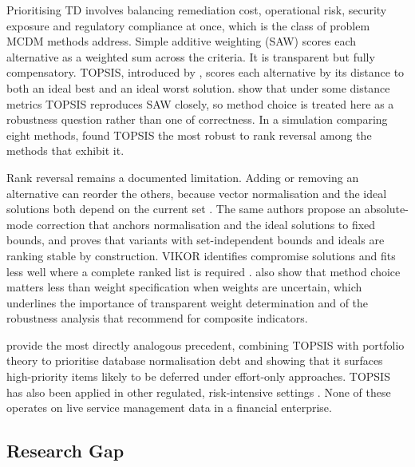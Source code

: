 \documentclass[
  authoryear,
  preprint]{elsarticle}
\begin{document}
Prioritising TD involves balancing remediation cost, operational risk,
security exposure and regulatory compliance at once, which is the class
of problem MCDM methods address. Simple additive weighting (SAW) scores
each alternative as a weighted sum across the criteria. It is
transparent but fully compensatory. TOPSIS, introduced by
\citet{hwangMultipleAttributeDecision1981}, scores each alternative by
its distance to both an ideal best and an ideal worst solution.
\citet{ciardielloComparisonTOPSISSAW2023} show that under some distance
metrics TOPSIS reproduces SAW closely, so method choice is treated here
as a robustness question rather than one of correctness. In a simulation
comparing eight methods, \citet{zanakisMultiattributeDecisionMaking1998}
found TOPSIS the most robust to rank reversal among the methods that
exhibit it.

Rank reversal remains a documented limitation. Adding or removing an
alternative can reorder the others, because vector normalisation and the
ideal solutions both depend on the current set
\citep{garcia-cascalesRankReversalTOPSIS2012}. The same authors propose
an absolute-mode correction that anchors normalisation and the ideal
solutions to fixed bounds, and \citet{yangIngeniousSolutionRank2020}
proves that variants with set-independent bounds and ideals are ranking
stable by construction. VIKOR identifies compromise solutions and fits
less well where a complete ranked list is required
\citep{shekhovtsovComparativeCaseStudy2020}.
\citet{shekhovtsovComparativeCaseStudy2020} also show that method choice
matters less than weight specification when weights are uncertain, which
underlines the importance of transparent weight determination and of the
robustness analysis that
\citet{grecoMethodologicalFrameworkComposite2019} recommend for
composite indicators.

\citet{albarakManagingTechnicalDebt2022} provide the most directly
analogous precedent, combining TOPSIS with portfolio theory to
prioritise database normalisation debt and showing that it surfaces
high-priority items likely to be deferred under effort-only approaches.
TOPSIS has also been applied in other regulated, risk-intensive settings
\citep{zytoonDecisionSupportModel2020, khanIntegratedMethodologyRanking2022}.
None of these operates on live service management data in a financial
enterprise.

\subsection{Research Gap}\label{research-gap}
\end{document}
